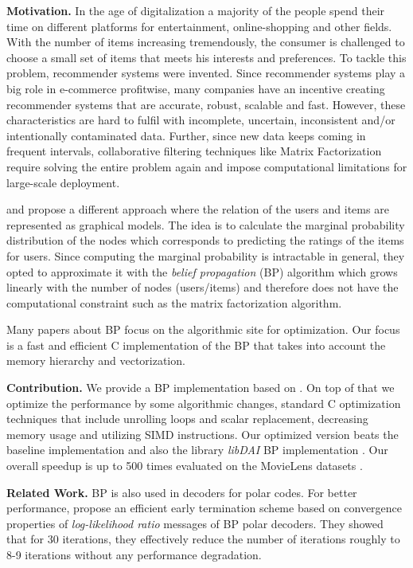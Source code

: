 \documentclass[letterpaper]{article}
\newcommand{\mypar}[1]{{\bf #1.}}
\begin{document}
\mypar{Motivation}
In the age of digitalization a majority of the people spend their time on different platforms for entertainment, online-shopping and other fields. With the number of items increasing tremendously, the consumer is challenged to choose a small set of items that meets his interests and preferences. To tackle this problem, recommender systems were invented. Since recommender systems play a big role in e-commerce profitwise, many companies have an incentive creating recommender systems that are accurate, robust, scalable and fast. However, these characteristics are hard to fulfil with incomplete, uncertain, inconsistent and/or intentionally contaminated data. Further, since new data keeps coming in frequent intervals, collaborative filtering techniques like Matrix Factorization require solving the entire problem again and impose computational limitations for large-scale deployment.

\citet{BPRS} and \citet{top-n-recommendation} propose a different approach where the relation of the users and items are represented as graphical models. The idea is to calculate the marginal probability distribution of the nodes which corresponds to predicting the ratings of the items for users. Since computing the marginal probability is intractable in general, they opted to approximate it with the \emph{belief propagation} (BP) algorithm which grows linearly with the number of nodes (users/items) and therefore does not have the computational constraint such as the matrix factorization algorithm.

Many papers about BP focus on the algorithmic site for optimization. Our focus is a fast and efficient C implementation of the BP that takes into account the memory hierarchy and vectorization.

\mypar{Contribution}
We provide a BP implementation based on \citet{top-n-recommendation}. On top of that we optimize the performance by some algorithmic changes, standard C optimization techniques that include unrolling loops and scalar replacement, decreasing memory usage and utilizing SIMD instructions. Our optimized version beats the baseline implementation and also the library \emph{libDAI} BP implementation \cite{libdai}. Our overall speedup is up to 500 times evaluated on the MovieLens datasets \cite{movieLens}.

\mypar{Related Work}
BP is also used in decoders for polar codes. For better performance, \citet{related1} propose an efficient early termination scheme based on convergence properties of \emph{log-likelihood ratio} messages of BP polar decoders. They showed that for 30 iterations, they effectively reduce the number of iterations roughly to 8-9 iterations without any performance degradation.
\end{document}
